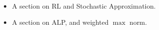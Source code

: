 \begin{itemize}
\item A section on RL and Stochastic Approximation.
\item A section on ALP, and weighted $\max$ norm.
\end{itemize}
